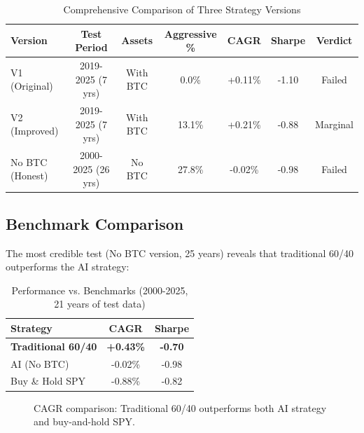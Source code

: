 \documentclass[twocolumn,ieee]{arithmaxresearch}
\begin{document}
\begin{table}[t]
\centering
\caption{Comprehensive Comparison of Three Strategy Versions}
\label{tab:overview}
\begin{tabular}{lcccccc}
\toprule
\textbf{Version} & \textbf{Test Period} & \textbf{Assets} & \textbf{Aggressive \%} & \textbf{CAGR} & \textbf{Sharpe} & \textbf{Verdict} \\
\midrule
V1 (Original) & 2019-2025 (7 yrs) & With BTC & 0.0\% & +0.11\% & -1.10 & Failed \\
V2 (Improved) & 2019-2025 (7 yrs) & With BTC & 13.1\% & +0.21\% & -0.88 & Marginal \\
No BTC (Honest) & 2000-2025 (26 yrs) & No BTC & 27.8\% & -0.02\% & -0.98 & Failed \\
\bottomrule
\end{tabular}
\end{table}

\subsection{Benchmark Comparison}

The most credible test (No BTC version, 25 years) reveals that traditional 60/40 outperforms the AI strategy:

\begin{table}[h]
\centering
\caption{Performance vs. Benchmarks (2000-2025, 21 years of test data)}
\label{tab:benchmarks}
\begin{tabular}{lcc}
\toprule
\textbf{Strategy} & \textbf{CAGR} & \textbf{Sharpe} \\
\midrule
\textbf{Traditional 60/40} & \textbf{+0.43\%} & \textbf{-0.70} \\
AI (No BTC) & -0.02\% & -0.98 \\
Buy \& Hold SPY & -0.88\% & -0.82 \\
\bottomrule
\end{tabular}
\end{table}

\begin{figure}[h]
\centering
{}
\caption{CAGR comparison: Traditional 60/40 outperforms both AI strategy and buy-and-hold SPY.}
\label{fig:cagr_comparison}
\end{figure}
\end{document}
